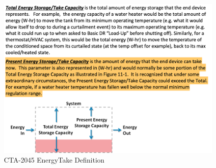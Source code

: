\begin{figure}[htp!]
    \centering
    \includegraphics[width=0.9\columnwidth]{Pictures/cta_def.png}
    \caption{CTA-2045 EnergyTake Definition}
    \label{fig:cta_def}
\end{figure}

